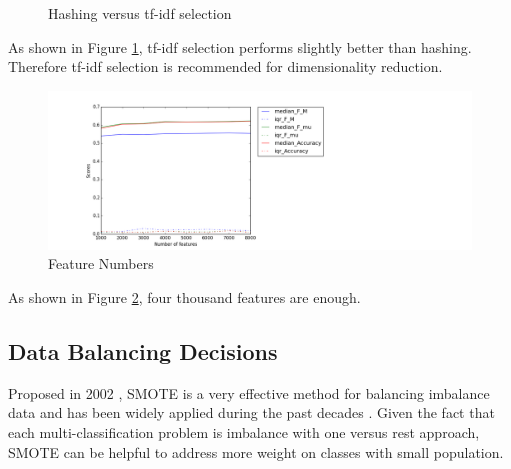 \documentclass{sig-alternate-05-2015}
\begin{document}
\begin{figure}[ht]
    \centering
    \quad
    \quad
    \caption{Hashing versus tf-idf selection}
    \label{fig:sel}
\end{figure}

As shown in Figure \ref{fig:sel}, tf-idf selection performs slightly better than hashing. Therefore tf-idf selection is recommended for dimensionality reduction.

\begin{figure}[ht]
  \includegraphics[width=\linewidth]{./fig/fea_num.png}
  \caption{Feature Numbers}
  \label{fig:fea_num}
\end{figure}

As shown in Figure \ref{fig:fea_num}, four thousand features are enough.

\subsection{Data Balancing Decisions}

Proposed in 2002 \cite{chawla2002smote}, SMOTE is a very effective method for balancing imbalance data and has been widely applied during the past decades \cite{han2005borderline,bunkhumpornpat2009safe,luengo2011addressing}. Given the fact that each multi-classification problem is imbalance with one versus rest approach, SMOTE can be helpful to address more weight on classes with small population.
\end{document}
